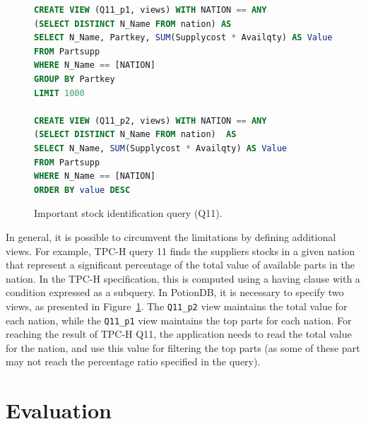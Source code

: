 \documentclass[sigplan,twocolumn,review,anonymous]{acmart}
\begin{document}
\begin{figure}[h]
	\begin{lstlisting}[language=SQL]
CREATE VIEW (Q11_p1, views) WITH NATION == ANY 
(SELECT DISTINCT N_Name FROM nation) AS
SELECT N_Name, Partkey, SUM(Supplycost * Availqty) AS Value
FROM Partsupp
WHERE N_Name == [NATION]
GROUP BY Partkey
LIMIT 1000

CREATE VIEW (Q11_p2, views) WITH NATION == ANY
(SELECT DISTINCT N_Name FROM nation)  AS
SELECT N_Name, SUM(Supplycost * Availqty) AS Value
FROM Partsupp
WHERE N_Name == [NATION]
ORDER BY value DESC
\end{lstlisting}
\vspace{-2pt}
	\caption{Important stock identification query (Q11). %
	}
	\vspace{-5pt}
	\label{fig:q5_view}
\end{figure}

In general, it is possible to circumvent the limitations by defining additional views.
For example, TPC-H query 11 finds the suppliers stocks in a given nation that represent a significant percentage of the total
value of available parts in the nation. In the TPC-H specification, this 
is computed using a having clause with a condition expressed as a subquery.
In PotionDB, it is necessary to specify two views, as presented in Figure~\ref{fig:q5_view}.
The \texttt{Q11\_p2} view maintains the total value for each nation, while the \texttt{Q11\_p1} view
maintains the top parts for each nation. For reaching the result of TPC-H Q11, the application needs
to read the total value for the nation, and use this value for filtering the top parts (as some of these part may not
reach the percentage ratio specified in the query).


\section{Evaluation}
\label{sec:evaluation}

\end{document}
